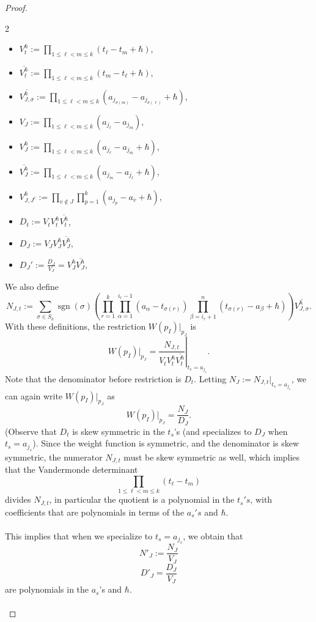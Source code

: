 \documentclass[12 pt]{article}
\theoremstyle{plain}
\theoremstyle{plain}
\theoremstyle{plain}
\theoremstyle{plain}
\theoremstyle{plain}
\theoremstyle{plain}
\theoremstyle{plain}
\theoremstyle{plain}
\theoremstyle{plain}
\theoremstyle{plain}
\theoremstyle{remark}
\theoremstyle{remark}
\theoremstyle{definition}
\theoremstyle{definition}
\theoremstyle{definition}
\theoremstyle{definition}
\theoremstyle{definition}
\theoremstyle{definition}
\DeclareMathOperator{\sgn}{sgn}
\begin{document}
\begin{proof}
\begin{multicols}{2}
\begin{itemize}
\item $V_{t}^{\hbar} := \prod\limits_{1 \leq \ell < m \leq k} (t_{\ell} - t_{m} + \hbar)$,
\item $\overline{V_{t}^{\hbar}} := \prod\limits_{1 \leq \ell < m \leq k} (t_{m} - t_{\ell} + \hbar)$,
\item $\overline{V_{J,\sigma}^{\hbar}} := \prod\limits_{1 \leq \ell < m \leq k} (a_{j_{\sigma(m)}} - a_{j_{\sigma(\ell)}} + \hbar)$,
\item $V_J := \prod\limits_{1 \leq \ell < m \leq k} (a_{j_\ell} - a_{j_m})$,
\item $V_J^{\hbar} :=  \prod\limits_{1 \leq \ell < m \leq k} (a_{j_\ell} - a_{j_m} + \hbar)$,
\item $\overline{V_J^{\hbar}} := \prod\limits_{1 \leq \ell < m \leq k} (a_{j_m} - a_{j_\ell} + \hbar)$,
\item $V_{J,J^c}^{\hbar} := \prod\limits_{v \not\in J} \prod\limits_{p = 1}^{k} (a_{j_p} - a_{v} + \hbar)$,
\item $D_t := V_t V_t^{\hbar} \overline{V_{t}^{\hbar}}$,
\item $D_J := V_J V_J^{\hbar} \overline{V_{J}^{\hbar}}$,
\item $D_J' := \frac{D_J}{V_J} = V_J^{\hbar}\overline{V_J^{\hbar}}$,
\end{itemize}
\end{multicols}
We also define \[N_{J,t} := \sum\limits_{\sigma \in S_k} \sgn(\sigma) \left(\prod\limits_{r = 1}^k \prod\limits_{\alpha = 1}^{i_{r} - 1} (a_{\alpha} - t_{\sigma(r)}) \prod\limits_{\beta = i_r + 1}^n (t_{\sigma(r)} - a_{\beta} + \hbar) \right) \overline{V_{J,\sigma}^{\hbar}}.\]
With these definitions, the restriction $W(p_I)|_{p_J}$ is
\[W(p_I)|_{p_J} = \left.\dfrac{N_{J,t}}{V_{t}V_{t}^{\hbar}\overline{V_{t}^{\hbar}}}\right|_{t_s = a_{j_s}}.\]
Note that the denominator before restriction is $D_t$.
Letting $N_{J}:=N_{J,t}|_{t_{s}=a_{j_{s}}}$, we can again write $W(p_I)|_{p_J}$ as \[W(p_I)|_{p_J} = \dfrac{N_J}{D_J}.\](Observe that $D_{t}$ is skew symmetric in the $t_{s}$'s (and specializes to $D_{J}$ when $t_{s}=a_{j_{s}}$). Since the weight function is symmetric, and the denominator is skew symmetric, the numerator $N_{J,t}$ must be skew symmetric as well, which implies that the Vandermonde determinant 
\[\prod\limits_{1 \leq \ell < m \leq k}(t_{\ell}-t_{m})\]
divides $N_{J,t}$, in particular the quotient is a polynomial in the $t_{s}'s$, with coefficients that are polynomials in terms of the $a_{s}'s$ and $\hbar$.\\\\
This implies that when we specialize to $t_{s}=a_{j_{s}}$, we obtain that
\[N'_{J}:=\frac{N_{J}}{V_{J}}\]
\[D'_{J} =\frac{D_{J}}{V_{J}}\]
are polynomials in the $a_{s}$'s and $\hbar$.\\\\



\end{proof}
\end{document}
